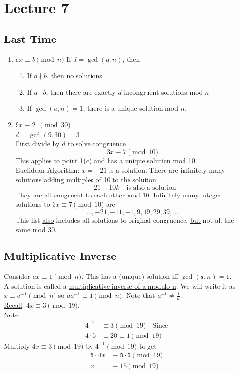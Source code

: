 \chapter{Lecture 7}
\date{September 17, 2024}

\section{Last Time}
\begin{enumerate}
    \item $ax\equiv b \pmod{n}$
        If $d=\gcd(a,n)$, then 
        \begin{enumerate}
            \item If $d\nmid b$, then no solutions
            \item If $d\mid b$, then there are exactly $d$ incongruent solutions mod $n$
            \item If $\gcd(a,n)=1$, there is a unique solution mod $n$.
        \end{enumerate}
    \item $9x\equiv 21 \pmod{30}$ \\
        $d=\gcd(9,30)=3$ \\
        First divide by $d$ to solve congruence
        \[ 3x\equiv 7\pmod{10} \] 
        This applies to point 1(c) and has a \underline{unique} solution mod 10. \\
        Euclidean Algorithm: $x=-21$ is a solution.  There are infinitely many solutions
        adding multiples of 10 to the solution.
        \[ -21+10k \quad\text{is also a solution} \]
        They are all congruent to each other mod 10.
        Infinitely many integer solutions to $3x\equiv 7\pmod{10}$ are
        \[ \dots,-21,-11,-1,9,19,29,39,\dots \]
        This list \underline{also} includes all solutions to original congruence, 
        \underline{but} not all the same mod 30.
\end{enumerate}
    
\section{Multiplicative Inverse}
    Consider $ax\equiv 1\pmod{n}$. This has a (unique) solution iff 
    $\gcd(a,n)=1$. \\
    A solution is called a \underline{multiplicative inverse of
    a modulo n}. We will write it as $x\equiv a^{-1}\pmod{n}$ so $aa^{-1}\equiv 1\pmod{n}$.
    Note that $a^{-1}\ne \frac{1}{a}$. \\
    \underline{Recall}. $4x\equiv 3\pmod{19}$. \\
    Note. 
    \begin{align*}
        4^{-1} &\equiv 3\pmod{19} \quad\text{Since} \\
        4\cdot 5 &\equiv 20\equiv 1\pmod{19}
    \end{align*}
    Multiply $4x\equiv 3\pmod{19}$ by $4^{-1}\pmod{19}$ to get 
    \begin{align*}
        5\cdot 4x &\equiv 5\cdot 3\pmod{19} \\
        x &\equiv 15 \pmod{19}
    \end{align*} 

